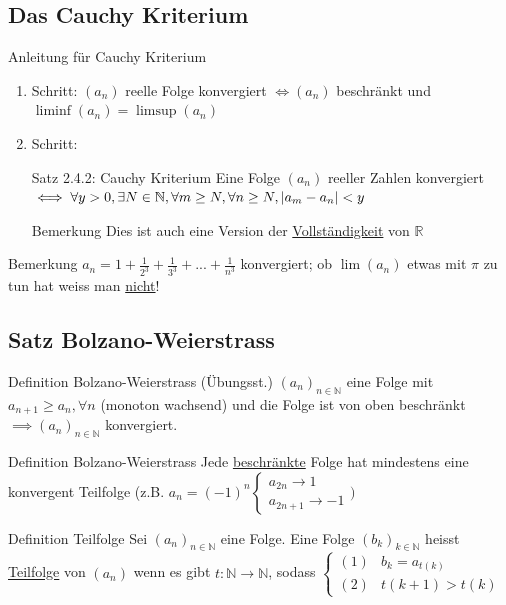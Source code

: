 \documentclass[a4paper,10pt]{article}
\begin{document}
\subsection{Das Cauchy Kriterium}
\begin{tipbox}{Anleitung für Cauchy Kriterium}
    \begin{enumerate}
        \item Schritt: $(a_n)$ reelle Folge konvergiert $\iff (a_n)$ beschränkt und $\liminf(a_n)=\limsup(a_n)$
        \item Schritt: 
        \begin{tbox} {Satz 2.4.2: Cauchy Kriterium}
            Eine Folge $(a_n)$ reeller Zahlen konvergiert $\iff \forall y>0, \exists N \in \mathbb N, \\ 
            \forall m\ge N, \forall n \ge N, |a_m-a_n|<y$ 
        \end{tbox}
        \begin{bembox}{Bemerkung}
            Dies ist auch eine Version der \underline{Vollständigkeit} von $\mathbb R$
        \end{bembox}
    \end{enumerate}
\end{tipbox}
\begin{bembox}{Bemerkung}
$a_n=1+\frac{1}{2^3}+\frac{1}{3^3}+...+\frac{1}{n^3}$ konvergiert; ob $\lim(a_n)$ etwas mit $\pi$ zu tun hat weiss man \underline{nicht}!
    
\end{bembox}

\subsection{Satz Bolzano-Weierstrass}

\begin{tbox} {Definition Bolzano-Weierstrass (Übungsst.)}
$(a_n)_{n\in\mathbb N}$ eine Folge mit $a_{n+1}\ge a_n, \forall n$ (monoton wachsend) und die Folge ist von oben beschränkt $\implies (a_n)_{n\in\mathbb N}$ konvergiert.
\end{tbox}

\begin{tbox}{Definition Bolzano-Weierstrass}
Jede \underline{beschränkte} Folge hat mindestens eine konvergent Teilfolge (z.B. $a_n=(-1)^n 
\begin{cases}
    a_{2n} \longrightarrow 1
    \\a_{2n+1} \longrightarrow -1
\end{cases})$
\end{tbox} 
\begin{defbox} {Definition Teilfolge}
    Sei $(a_n)_{n\in\mathbb N}$ eine Folge. Eine Folge $(b_k)_{k\in\mathbb N}$ heisst \underline{Teilfolge} von $(a_n)$ wenn es gibt $t:\mathbb N \longrightarrow \mathbb N$, sodass 
    $\begin{cases}
        (1) & b_k=a_{t(k)}
        \\(2) & t(k+1)>t(k)
    \end{cases}$
\end{defbox}
\end{document}
